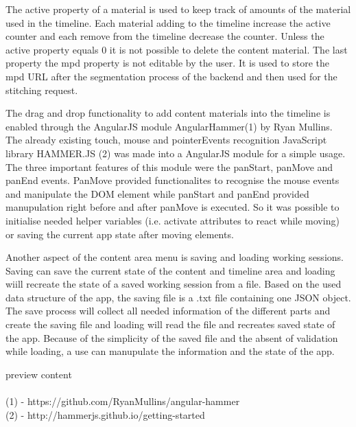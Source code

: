 \documentclass[conference]{IEEEtran}
\begin{document}
The active property of a material is used to keep track of amounts of the material used in the timeline. Each material adding to the timeline increase the active counter and each remove from the timeline decrease the counter. Unless the active property equals 0 it is not possible to delete the content material. The last property the mpd property is not editable by the user. It is used to store the mpd URL after the segmentation process of the backend and then used for the stitching request.

The drag and drop functionality to add content materials into the timeline is enabled through the AngularJS module AngularHammer(1) by Ryan Mullins. The already existing touch, mouse and pointerEvents recognition JavaScript library HAMMER.JS (2) was made into a AngularJS module for a simple usage. The three important features of this module were the panStart, panMove and panEnd events. PanMove provided functionalites to recognise the mouse events and manipulate the DOM element while panStart and panEnd provided manupulation right before and after panMove is executed. So it was possible to initialise needed helper variables (i.e. activate attributes to react while moving) or saving the current app state after moving elements.

Another aspect of the content area menu is saving and loading working sessions. Saving can save the current state of the content and timeline area and loading wiill recreate the state of a saved working session from a file. Based on the used data structure of the app, the saving file is a .txt file containing one JSON object. The save process will collect all needed information of the different parts and create the saving file and loading will read the file and recreates saved state of the app. Because of the simplicity of the saved file and the absent of validation while loading, a use can manupulate the information and the state of the app.

preview content\\
\\
(1) - https://github.com/RyanMullins/angular-hammer\\
(2) - http://hammerjs.github.io/getting-started\\
\\
\end{document}
